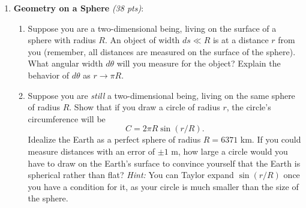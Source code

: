\documentclass[12pt,preprint]{aastex}
\begin{document}
\begin{enumerate}
\pagebreak
\item \textbf{Geometry on a Sphere} \textit{(38 pts)}: 
	\begin{enumerate}
	\item Suppose you are a two-dimensional being, living on the surface of a sphere with radius $R$. An object of width $ds \ll R$ is at a distance $r$ from you (remember, all distances are measured on the surface of the sphere). What angular width $d\theta$ will you measure for the object? Explain the behavior of $d\theta$ as $r \rightarrow \pi R$. 
	\item Suppose you are \textit{still} a two-dimensional being, living on the same sphere of radius $R$. Show that if you draw a circle of radius $r$, the circle's circumference will be 
	$$ C = 2\pi R \sin(r/R). $$
	Idealize the Earth as a perfect sphere of radius $R = 6371$ km. If you could measure distances with an error of $\pm 1$ m, how large a circle would you have to draw on the Earth's surface to convince yourself that the Earth is spherical rather than flat? \textit{Hint:} You can Taylor expand $\sin(r/R)$ once you have a condition for it, as your circle is much smaller than the size of the sphere. 
	\end{enumerate}

\end{enumerate}
\end{document}
